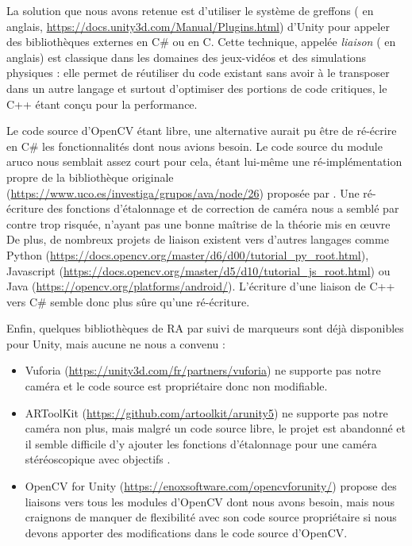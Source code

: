 La solution que nous avons retenue est d'utiliser le système de greffons ( en anglais, \url{https://docs.unity3d.com/Manual/Plugins.html}) d'Unity pour appeler des bibliothèques externes en C\# ou en C. Cette technique, appelée \emph{liaison} ( en anglais) est classique dans les domaines des jeux-vidéos et des simulations physiques : elle permet de réutiliser du code existant sans avoir à le transposer dans un autre langage et surtout d'optimiser des portions de code critiques, le C++ étant conçu pour la performance.

Le code source d'OpenCV étant libre, une alternative aurait pu être de ré-écrire en C\# les fonctionnalités dont nous avions besoin. Le code source du module aruco nous semblait assez court pour cela, étant lui-même une ré-implémentation propre de la bibliothèque originale (\url{https://www.uco.es/investiga/grupos/ava/node/26}) proposée par \cite{Garrido-Jurado2014}. Une ré-écriture des fonctions d'étalonnage et de correction de caméra nous a semblé par contre trop risquée, n'ayant pas une bonne maîtrise de la théorie mis en œuvre De plus, de nombreux projets de liaison existent vers d'autres langages comme Python (\url{https://docs.opencv.org/master/d6/d00/tutorial_py_root.html}), Javascript (\url{https://docs.opencv.org/master/d5/d10/tutorial_js_root.html}) ou Java (\url{https://opencv.org/platforms/android/}). L'écriture d'une liaison de C++ vers C\# semble donc plus sûre qu'une ré-écriture.

Enfin, quelques bibliothèques de RA par suivi de marqueurs sont déjà disponibles pour Unity, mais aucune ne nous a convenu :
\begin{itemize}
  \item Vuforia (\url{https://unity3d.com/fr/partners/vuforia}) ne supporte pas notre caméra et le code source est propriétaire donc non modifiable.
  \item ARToolKit (\url{https://github.com/artoolkit/arunity5}) ne supporte pas notre caméra non plus, mais malgré un code source libre, le projet est abandonné et il semble difficile d'y ajouter les fonctions d'étalonnage pour une caméra stéréoscopique avec objectifs .
  \item OpenCV for Unity (\url{https://enoxsoftware.com/opencvforunity/}) propose des liaisons vers tous les modules d'OpenCV dont nous avons besoin, mais nous craignons de manquer de flexibilité avec son code source propriétaire si nous devons apporter des modifications dans le code source d'OpenCV.
\end{itemize}

